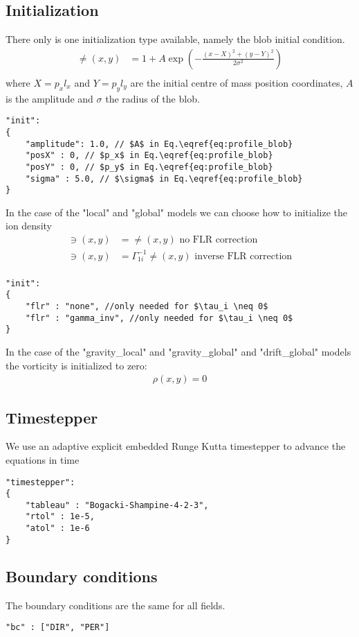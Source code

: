 \subsection{Initialization}
There only is one initialization type available, namely the blob initial condition.
\begin{align} \label{eq:profile_blob}
    \ne(x,y) &= 1 + A\exp\left( -\frac{(x-X)^2 + (y-Y)^2}{2\sigma^2}\right) \\
\end{align}
where $X = p_xl_x$ and $Y= p_yl_y$ are the initial centre of mass position coordinates, $A$ is the amplitude and $\sigma$ the
radius of the blob.
\begin{verbatim}
"init":
{
    "amplitude": 1.0, // $A$ in Eq.\eqref{eq:profile_blob}
    "posX" : 0, // $p_x$ in Eq.\eqref{eq:profile_blob}
    "posY" : 0, // $p_y$ in Eq.\eqref{eq:profile_blob}
    "sigma" : 5.0, // $\sigma$ in Eq.\eqref{eq:profile_blob}
}
\end{verbatim}
In the case of the "local" and "global" models we can choose how to initialize
the ion density
\begin{align}
    \ni(x,y) &= \ne(x,y) \text{ no FLR correction} \\
    \ni(x,y) &= \Gamma_{1i}^{-1} \ne(x,y) \text{ inverse FLR correction} \\
\end{align}
\begin{verbatim}
"init":
{
    "flr" : "none", //only needed for $\tau_i \neq 0$
    "flr" : "gamma_inv", //only needed for $\tau_i \neq 0$
}
\end{verbatim}
In the case of the "gravity\_local" and "gravity\_global" and "drift\_global" models
the vorticity is initialized to zero:
\begin{align}
    \rho(x,y) = 0
\end{align}

\subsection{Timestepper}
We use an adaptive explicit embedded Runge Kutta timestepper to advance the equations in time
\begin{verbatim}
"timestepper":
{
    "tableau" : "Bogacki-Shampine-4-2-3",
    "rtol" : 1e-5,
    "atol" : 1e-6
}
\end{verbatim}
\subsection{Boundary conditions}
The boundary conditions are the same for all fields.
\begin{verbatim}
"bc" : ["DIR", "PER"]
\end{verbatim}

